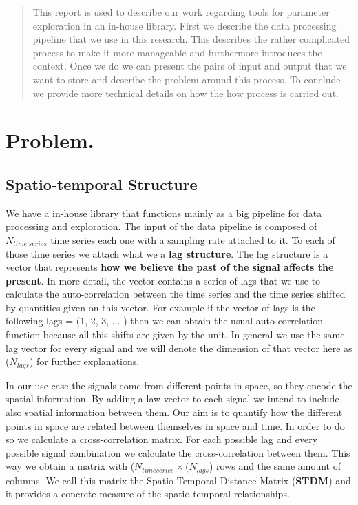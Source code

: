 \documentclass[11pt,a4paper]{article}
\begin{document}
\begin{abstract}
This report is used to describe our work regarding tools for parameter
exploration in an in-house library. First we describe the data
processing pipeline that we use in this research. This describes the rather complicated process to make it more manageable and furthermore introduces the context. Once we do we can present the pairs of input and output that we want to store and describe the problem around this process. To conclude we provide more technical details on how the how process is carried out. 
\end{abstract}


\section{Problem.}\label{problem.}

\subsection{Spatio-temporal Structure}\label{spatio-temporal-structure}

We have a in-house library that functions mainly as a big pipeline for
data processing and exploration. The input of the data pipeline is composed of $N_{time\:series}$ time series each one with a sampling rate attached to it. To each of those time series we attach what we a \textbf{lag structure}. The lag structure is a vector that
represents \textbf{how we believe the past of the signal affects the
present}. In more detail, the vector contains a series of lags that we
use to calculate the auto-correlation between the time series and the
time series shifted by quantities given on this vector. For example if the vector of lags is
the following lags = (1, 2, 3, ... ) then we can obtain the usual
auto-correlation function because all this shifts are given by the unit. In general we use the same lag vector for every signal and we will denote the dimension of that vector here as
($N_{lags}$) for further explanations.

In our use case the signals come from different points in space, so they
encode the spatial information. By adding a law vector to each signal we
intend to include also spatial information between them. Our aim is to
quantify how the different points in space are related between
themselves in space and time. In order to do so we calculate a
cross-correlation matrix. For each possible lag and every possible
signal combination we calculate the cross-correlation between them. This
way we obtain a matrix with ($N_{time series} \times (N_{lags}$)
rows and the same amount of columns. We call this matrix the Spatio
Temporal Distance Matrix (\textbf{STDM}) and it provides a concrete
measure of the spatio-temporal relationships.
\end{document}
